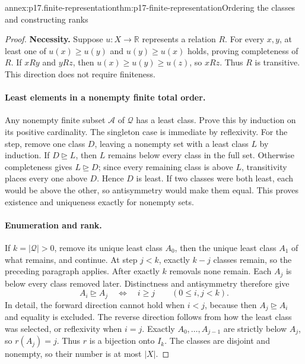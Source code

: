 \begin{annexitem}{annex:p17.finite-representation}{thm:p17-finite-representation}{Ordering the classes and constructing ranks}
\begin{proof}
\textbf{Necessity.}\enspace
Suppose \(u:X\to\mathbb{R}\) represents a relation \(R\). For every
\(x,y\), at least one of \(u(x)\geq u(y)\) and
\(u(y)\geq u(x)\) holds, proving completeness of \(R\). If
\(xRy\) and \(yRz\), then \(u(x)\geq u(y)\geq u(z)\), so
\(xRz\). Thus \(R\) is transitive. This direction does not require
finiteness.

\paragraph{Least elements in a nonempty finite total order.}
Any nonempty finite subset \(\mathcal A\) of \(\mathcal Q\) has a
least class. Prove this by induction on its positive cardinality. The
singleton case is immediate by reflexivity. For the step, remove one class
\(D\), leaving a nonempty set with a least class \(L\) by induction.
If \(D\unrhd L\), then \(L\) remains below every class in the
full set. Otherwise completeness gives \(L\unrhd D\); since every
remaining class is above \(L\), transitivity places every one above
\(D\). Hence \(D\) is least. If two classes were both least,
each would be above the other, so antisymmetry would make them equal.
This proves existence and uniqueness exactly for nonempty sets.

\paragraph{Enumeration and rank.}
If \(k=|\mathcal Q|>0\), remove its unique least class \(A_0\),
then the unique least class \(A_1\) of what remains, and continue.
At step \(j<k\), exactly \(k-j\) classes remain, so the preceding
paragraph applies. After exactly \(k\) removals none remain. Each
\(A_j\) is below every class removed later. Distinctness and
antisymmetry therefore give
\[
 A_i\unrhd A_j\quad\Longleftrightarrow\quad i\geq j
                                    \qquad(0\leq i,j<k).
\]
In detail, the forward direction cannot hold when \(i<j\), because
then \(A_j\unrhd A_i\) and equality is excluded. The reverse direction
follows from how the least class was selected, or reflexivity when \(i=j\).
Exactly \(A_0,\ldots,A_{j-1}\) are strictly below \(A_j\), so
\(r(A_j)=j\). Thus \(r\) is a bijection onto \(I_k\). The
classes are disjoint and nonempty, so their number is at most \(|X|\).


\end{proof}
\end{annexitem}
